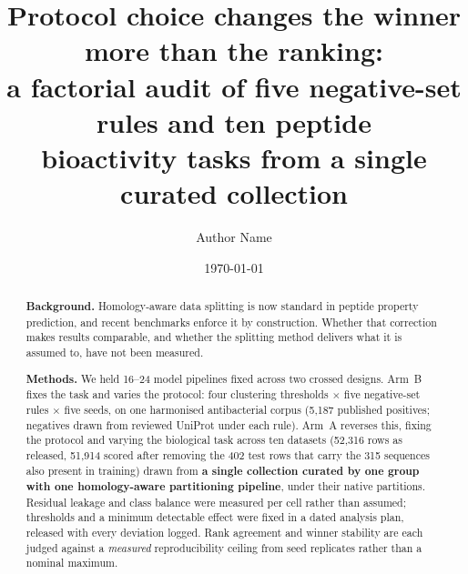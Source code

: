 \documentclass[11pt,a4paper]{article}
\title{\bfseries Protocol choice changes the winner more than the ranking:\\
a factorial audit of five negative-set rules and ten peptide\\
bioactivity tasks from a single curated collection}
\author[1]{Author Name}
\affil[1]{Affiliation, City, Country}
\date{\today}
\begin{document}
\maketitle

\begin{abstract}
\noindent\textbf{Background.} Homology-aware data splitting is now standard in peptide
property prediction, and recent benchmarks enforce it by construction. Whether that
correction makes results comparable, and whether the splitting method delivers what it is
assumed to, have not been measured.

\noindent\textbf{Methods.} We held 16--24 model pipelines fixed across two crossed
designs. Arm~B fixes the task and varies the protocol: four clustering thresholds
$\times$ five negative-set rules $\times$ five seeds, on one harmonised antibacterial
corpus (5{,}187 published positives; negatives drawn from reviewed UniProt under each
rule). Arm~A reverses this, fixing the protocol and varying the biological task across ten
datasets (52{,}316 rows as released, 51{,}914 scored after removing the 402 test rows that
carry the 315 sequences also present in training) drawn from \textbf{a single collection
curated by one
group with one homology-aware partitioning pipeline}, under their native partitions.
Residual leakage and
class balance were measured per cell rather than assumed; thresholds and a minimum
detectable effect were fixed in a dated analysis plan, released with every deviation
logged. Rank agreement and winner stability are each judged against a \emph{measured}
reproducibility ceiling from seed replicates rather than a nominal maximum.


\end{abstract}
\end{document}
